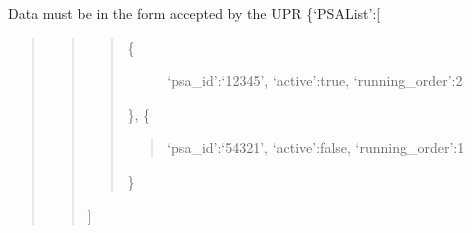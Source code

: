 \documentclass[letterpaper,10pt,oneside]{sphinxmanual}
\begin{document}
\begin{fulllineitems}

\begin{fulllineitems}
\label{upr_client:upr_client.UPRClient.put_group_psa}
\end{fulllineitems}


\begin{fulllineitems}
\label{upr_client:upr_client.UPRClient.put_user_hspl}
\end{fulllineitems}


\begin{fulllineitems}
\label{upr_client:upr_client.UPRClient.put_user_mspl_psa}
\end{fulllineitems}


\begin{fulllineitems}
\label{upr_client:upr_client.UPRClient.put_user_psa}
Data must be in the form accepted by the UPR
\{`PSAList':{[}
\begin{quote}
\begin{quote}
\begin{quote}
\begin{description}
\item[{\{}] \leavevmode
`psa\_id':`12345',
`active':true,
`running\_order':2

\end{description}

\},
\{
\begin{quote}

`psa\_id':`54321',
`active':false,
`running\_order':1
\end{quote}

\}
\end{quote}

{]}
\end{quote}


\end{quote}
\end{fulllineitems}
\end{fulllineitems}
\end{document}
